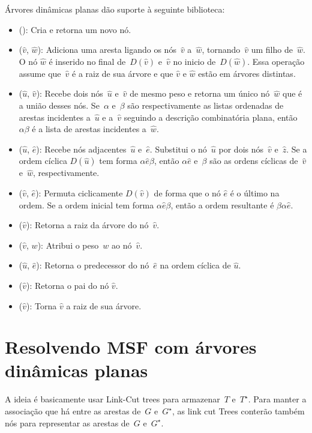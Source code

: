 Árvores dinâmicas planas dão suporte à seguinte biblioteca:
\begin{itemize}
\item \LCOMakeNode(): Cria e retorna um novo nó.
\item \LCOLink($\hat v$, $\hat w$): Adiciona uma aresta ligando os nós~$\hat v$ a~$\hat w$, tornando~$\hat v$ um filho de~$\hat w$.
O nó $\hat w$ é inserido no final de~$D(\hat v)$ e~$\hat v$ no inicio de~$D(\hat w)$.
Essa operação assume que~$\hat v$ é a raiz de sua árvore e que $\hat v$ e $\hat w$ estão em árvores distintas.
\item \LCOMerge($\hat u$, $\hat v$): Recebe dois nós~$\hat u$ e~$\hat v$ de mesmo peso e retorna um único nó~$\hat w$ que é a união desses nós.
Se~$\alpha$ e~$\beta$ são respectivamente as listas ordenadas de arestas incidentes a~$\hat u$ e a~$\hat v$ seguindo a descrição combinatória plana, então $\alpha\beta$ é a lista de arestas incidentes a~$\hat w$.
\item \LCOSplit($\hat u$, $\hat e$): Recebe nós adjacentes~$\hat u$ e~$\hat e$.
Substitui o nó~$\hat u$ por dois nós~$\hat v$ e~$\hat z$.
Se a ordem cíclica $D(\hat u)$ tem forma $\alpha \hat e\beta$, então $\alpha \hat e$ e~$\beta$ são as ordens cíclicas de~$\hat v$ e~$\hat w$, respectivamente.
\item \LCOCycle($\hat v$, $\hat e$): Permuta ciclicamente $D(\hat v)$ de forma que o nó $\hat e$ é o último na ordem. Se a ordem inicial tem forma $\alpha \hat e \beta$, então a ordem resultante é $\beta\alpha \hat e$.
\item \LCORoot($\hat v$): Retorna a raiz da árvore do nó~$\hat v$.
\item \LCOAddCost($\hat v$, $w$): Atribui o peso~$w$ ao nó~$\hat v$.
\item \LCOPredecessor($\hat u$, $\hat e$): Retorna o predecessor do nó~$\hat e$ na ordem cíclica de $\hat u$.
\item \LCOParent($\hat v$): Retorna o pai do nó $\hat v$.
\item \LCOEvert($\hat v$): Torna $\hat v$ a raiz de sua árvore.
\end{itemize}

\section{Resolvendo MSF com árvores dinâmicas planas}


A ideia é basicamente usar Link-Cut trees para armazenar~$T$ e~$T^\star$.
Para manter a associação que há entre as arestas de~$G$ e~$G^\star$, as link cut Trees conterão também nós para representar as arestas de~$G$ e~$G^\star$.

